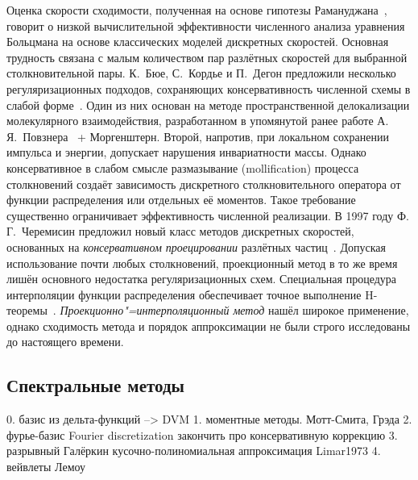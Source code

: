 Оценка скорости сходимости, полученная на основе гипотезы Рамануджана~\cite{Ramanujan1916},
говорит о низкой вычислительной эффективности численного анализа уравнения Больцмана
на основе классических моделей дискретных скоростей. Основная трудность связана с малым количеством
пар разлётных скоростей для выбранной столкновительной пары.
К.~Бюе, С.~Кордье и П.~Дегон предложили несколько регуляризационных подходов,
сохраняющих консервативность численной схемы в слабой форме~\cite{Buet1998}.
Один из них основан на методе пространственной делокализации молекулярного взаимодействия,
разработанном в упомянутой ранее работе А.\,Я.~Повзнера~\cite{Povzner1962} + Моргенштерн.
Второй, напротив, при локальном сохранении импульса и энергии, допускает нарушения инвариатности массы.
Однако консервативное в слабом смысле размазывание (mollification) процесса столкновений
создаёт зависимость дискретного столкновительного оператора от функции распределения
или отдельных её моментов. Такое требование существенно ограничивает эффективность численной реализации.
В 1997 году Ф.\,Г.~Черемисин предложил новый класс методов дискретных скоростей,
основанных на \emph{консервативном проецировании} разлётных частиц~\cite{Tcheremissine1997, Tcheremissine1998}.
Допуская использование почти любых столкновений,
проекционный метод в то же время лишён основного недостатка регуляризационных схем.
Специальная процедура интерполяции функции распределения обеспечивает точное выполнение H-теоремы~\cite{Tcheremissine2000}.
\emph{Проекционно"=интерполяционный метод} нашёл широкое применение,
однако сходимость метода и порядок аппроксимации не были строго исследованы до настоящего времени.

\subsection{Спектральные методы}
0. базис из дельта-функций --> DVM
1. моментные методы. Мотт-Смита, Грэда
2. фурье-базис Fourier discretization закончить про консервативную коррекцию
3. разрывный Галёркин кусочно-полиномиальная аппроксимация Limar1973
4. вейвлеты Лемоу




